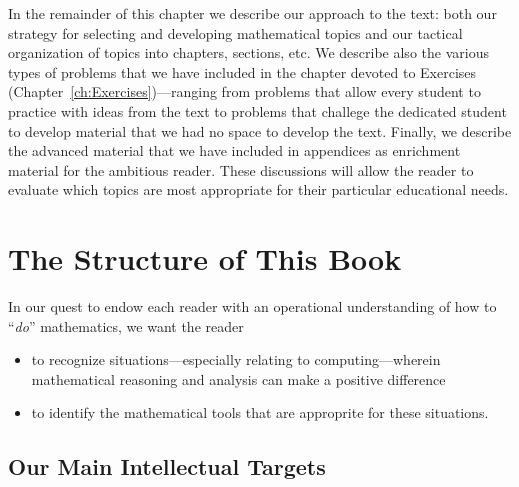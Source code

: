 \medskip

In the remainder of this chapter we describe our approach to the text:
both our strategy for selecting and developing mathematical topics and
our tactical organization of topics into chapters, sections, etc.  We
describe also the various types of problems that we have included in
the chapter devoted to Exercises
(Chapter~\ref{ch:Exercises})---ranging from problems that allow every
student to practice with ideas from the text to problems that challege
the dedicated student to develop material that we had no space to
develop the text.  Finally, we describe the advanced material that we
have included in appendices as enrichment material for the ambitious
reader.  These discussions will allow the reader to evaluate which
topics are most appropriate for their particular educational needs.



\section{The Structure of This Book}
\label{sec:thisbook}

In our quest to endow each reader with an operational understanding of
how to ``{\em do}'' mathematics, we want the reader
\begin{itemize}
\item
to recognize situations---especially relating to computing---wherein
mathematical reasoning and analysis can make a positive difference
\item
to identify the mathematical tools that are approprite for these
situations.
\end{itemize}


\subsection{Our Main Intellectual Targets}
\label{sec:book-overwiew}

